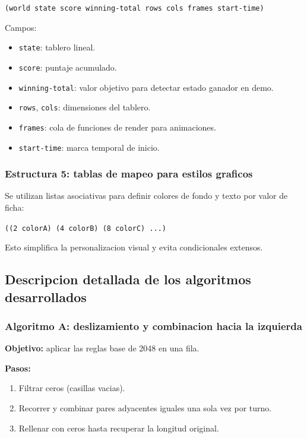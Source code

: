 \documentclass[12pt,a4paper]{article}
\begin{document}
\begin{center}
\texttt{(world state score winning-total rows cols frames start-time)}
\end{center}

Campos:
\begin{itemize}
    \item \texttt{state}: tablero lineal.
    \item \texttt{score}: puntaje acumulado.
    \item \texttt{winning-total}: valor objetivo para detectar estado ganador en demo.
    \item \texttt{rows}, \texttt{cols}: dimensiones del tablero.
    \item \texttt{frames}: cola de funciones de render para animaciones.
    \item \texttt{start-time}: marca temporal de inicio.
\end{itemize}

\subsubsection*{Estructura 5: tablas de mapeo para estilos graficos}
Se utilizan listas asociativas para definir colores de fondo y texto por valor de ficha:

\begin{center}
\texttt{((2 colorA) (4 colorB) (8 colorC) ...)}
\end{center}

Esto simplifica la personalizacion visual y evita condicionales extensos.

\subsection{Descripcion detallada de los algoritmos desarrollados}

\subsubsection*{Algoritmo A: deslizamiento y combinacion hacia la izquierda}
\textbf{Objetivo:} aplicar las reglas base de 2048 en una fila.

\textbf{Pasos:}
\begin{enumerate}
    \item Filtrar ceros (casillas vacias).
    \item Recorrer y combinar pares adyacentes iguales una sola vez por turno.
    \item Rellenar con ceros hasta recuperar la longitud original.
\end{enumerate}
\end{document}

